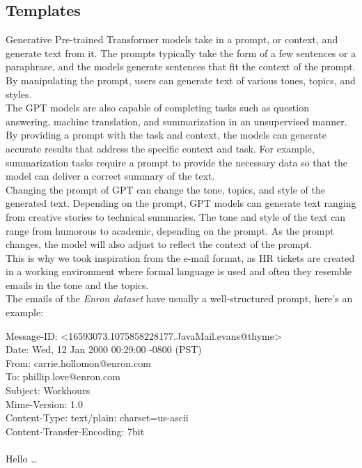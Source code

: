 \subsection*{Templates}
Generative Pre-trained Transformer\cite{radford2018improving} models take in a prompt, or context, and generate text from it. The prompts typically take the form of a few sentences or a paraphrase, and the models generate sentences that fit the context of the prompt. By manipulating the prompt, users can generate text of various tones, topics, and styles. \\
The GPT models are also capable of completing tasks such as question answering, machine translation, and summarization in an unsupervised manner\cite{radford2019language}. By providing a prompt with the task and context, the models can generate accurate results that address the specific context and task. For example, summarization tasks require a prompt to provide the necessary data so that the model can deliver a correct summary of the text. \\
Changing the prompt of GPT can change the tone, topics, and style of the generated text. Depending on the prompt, GPT models can generate text ranging from creative stories to technical summaries. The tone and style of the text can range from humorous to academic, depending on the prompt. As the prompt changes, the model will also adjust to reflect the context of the prompt. \\
This is why we took inspiration from the e-mail format, as HR tickets are created in a working environment where formal language is used and often they resemble emails in the tone and the topics. \\
The emails of the \textit{Enron dataset} have usually a well-structured prompt, here's an example: 
\begin{adjustwidth}{1cm}{}
    Message-ID: <16593073.1075858228177.JavaMail.evans@thyme>\\
    Date: Wed, 12 Jan 2000 00:29:00 -0800 (PST) \\
    From: carrie.hollomon@enron.com\\
    To: phillip.love@enron.com\\
    Subject: Workhours\\
    Mime-Version: 1.0\\
    Content-Type: text/plain; charset=us-ascii\\
    Content-Transfer-Encoding: 7bit\\\\
    Hello \dots
\end{adjustwidth}

